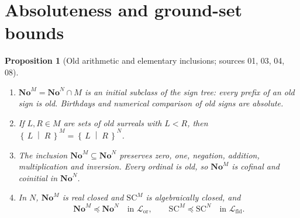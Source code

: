 \documentclass[11pt,letterpaper]{article}
\numberwithin{equation}{section}
\newtheorem{proposition}[proposition]{Proposition}
\theoremstyle{definition}
\theoremstyle{remark}
\newcommand{\No}{\mathbf{No}}
\newcommand{\SC}{\mathrm{SC}}
\newcommand{\NoM}{\No^{M}}
\newcommand{\NoN}{\No^{N}}
\newcommand{\SCM}{\SC^{M}}
\newcommand{\SCN}{\SC^{N}}
\newcommand{\Lang}{\mathcal L}
\newcommand{\cut}[2]{\left\{\,#1\;\middle|\;#2\,\right\}}
\begin{document}
\section{Absoluteness and ground-set bounds}\label{univ:sec:bounds}

\begin{proposition}[Old arithmetic and elementary inclusions; sources 01, 03, 04, 08]\label{univ:prop:absolute}
\begin{enumerate}[label=\textnormal{(\roman*)}]
\item $\NoM=\NoN\cap M$ is an initial subclass of the sign tree: every prefix
of an old sign is old. Birthdays and numerical comparison of old signs are
absolute.
\item If $L,R\in M$ are sets of old surreals with $L<R$, then
$\cut LR^M=\cut LR^N$.
\item The inclusion $\NoM\subseteq\NoN$ preserves zero, one, negation,
addition, multiplication and inversion. Every ordinal is old, so $\NoM$ is
cofinal and coinitial in $\NoN$.
\item In $N$, $\NoM$ is real closed and $\SCM$ is algebraically closed, and
\[
 \NoM\preccurlyeq\NoN\quad\text{in }\Lang_{\mathrm{or}},\qquad
 \SCM\preccurlyeq\SCN\quad\text{in }\Lang_{\mathrm{fld}}.
\]
\end{enumerate}
\end{proposition}
\end{document}
